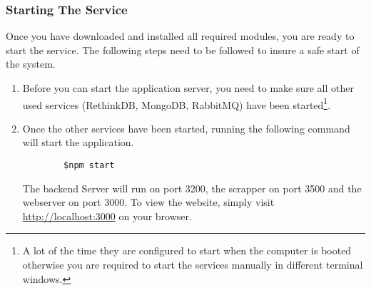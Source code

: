 \subsubsection{Starting The Service}
Once you have downloaded and installed all required modules, you are ready to start the service. The following steps need to be followed to insure a safe start of the system.
\begin{enumerate}
	\item Before you can start the application server, you need to make sure all other used services (RethinkDB, MongoDB, RabbitMQ) have been started\footnote{A lot of the time they are configured to start when the computer is booted otherwise you are required to start the services manually in different terminal windows.}. 
	\item Once the other services have been started, running the following command will start the application. 
	\begin{verbatim}
		$npm start			
	\end{verbatim}
	The backend Server will run on port 3200, the scrapper on port 3500 and the webserver on port 3000. To view the website, simply visit \url{http://localhost:3000} on your browser.
\end{enumerate}